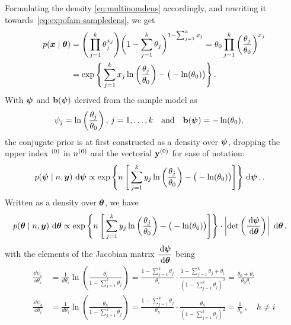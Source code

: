 Formulating the density \eqref{eq:multinomdens} accordingly, and rewriting it towards~\eqref{eq:expofam-sampledens},
we get
\begin{align*}
p(\x\mid\btheta)&= \Bigg( \prod_{j=1}^k \theta_j^{x_j}\Bigg) \bigg( 1 - \sum_{j=1}^k \theta_j\bigg)^{1-\sum_{j=1}^k x_j}%
                 = \theta_0 \prod_{j=1}^k \left(\frac{\theta_j}{\theta_0}\right)^{x_j} \\
                &= \exp\Bigg\{ \sum_{j=1}^k x_j \ln\bigg(\frac{\theta_j}{\theta_0}\bigg) - \big(-\ln(\theta_0)\big) \Bigg\}\,.
\end{align*}
With $\boldsymbol{\psi}$ and $\mathbf{b}(\boldsymbol{\psi})$ derived from the sample model as
\begin{align*}
\psi_j &= \ln\left(\frac{\theta_j}{\theta_0}\right),\, j=1,\ldots,k & \text{and}& &
\mbf{b}(\bpsi) &= -\ln(\theta_0),\,%
\end{align*}
the conjugate prior is at first constructed as a density over $\boldsymbol{\psi}$,
dropping the upper index ${}^{(0)}$ in $n^{(0)}$ and the vectorial $\mathbf{y}^{(0)}$ for ease of notation:
\begin{align*}
p(\boldsymbol{\psi}\mid n,{\bm y})\, \,\mathrm{d}\boldsymbol{\psi}
 &\propto \exp\Bigg\{n\, \Bigg[ \sum_{j=1}^k y_j \ln\bigg(\frac{\theta_j}{\theta_0}\bigg) - \big(-\ln(\theta_0)\big) \Bigg] \Bigg\} \,\,\mathrm{d}\boldsymbol{\psi}\,,.
\end{align*}
Written as a density over $\boldsymbol{\theta}$, we have
\begin{align*}
p(\boldsymbol{\theta}\mid n,{\bm y})\, \,\mathrm{d}\boldsymbol{\theta}
 &\propto \exp\Bigg\{n\, \Bigg[ \sum_{j=1}^k y_j \ln\bigg(\frac{\theta_j}{\theta_0}\bigg) - \big(-\ln(\theta_0)\big) \Bigg] \Bigg\}
  \cdot \left| \det\left(\frac{\,\mathrm{d}\boldsymbol{\psi}}{\,\mathrm{d}\boldsymbol{\theta}}\right) \right|\, \,\mathrm{d}\boldsymbol{\theta}\,,
\end{align*}
with the elements of the Jacobian matrix $\dfrac{\,\mathrm{d}\boldsymbol{\psi}}{\,\mathrm{d}\boldsymbol{\theta}}$ being
\begin{align*}
\frac{\dd\psi_i}{\dd\theta_i} &= \frac{1}{d\theta_i} \ln\left(\frac{\theta_i}{1 - \sum_{j=1}^k \theta_j}\right)
                               = \frac{1-\sum_{j=1}^k \theta_j}{\theta_i}
                                 \cdot \frac{1 - \sum_{j=1}^k \theta_j + \theta_i}{(1 - \sum_{j=1}^k \theta_j)^2}
                               = \frac{\theta_0 + \theta_i}{\theta_0 \theta_i}\\
\frac{\dd\psi_h}{\dd\theta_i} &= \frac{1}{d\theta_i} \ln\left(\frac{\theta_h}{1 - \sum_{j=1}^k \theta_j}\right)
                               = \frac{1-\sum_{j=1}^k \theta_j}{\theta_h} \cdot \frac{\theta_h}{(1 - \sum_{j=1}^k \theta_j)^2}
                               = \frac{1}{\theta_0}\,, \quad h \neq i
\end{align*}
